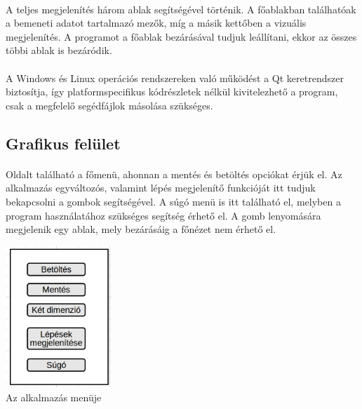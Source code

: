 \documentclass[12pt]{report}
\begin{document}
\paragraph{}
A teljes megjelenítés három ablak segítségével történik. A főablakban találhatóak a bemeneti adatot tartalmazó mezők, míg a másik kettőben a vizuális megjelenítés. A programot a főablak bezárásával tudjuk leállítani, ekkor az összes többi ablak is bezáródik.
\paragraph{}
A Windows és Linux operációs rendszereken való működést a Qt keretrendszer biztosítja, így platformspecifikus kódrészletek nélkül kivitelezhető a program, csak a megfelelő segédfájlok másolása szükséges.

\subsection{Grafikus felület}
\paragraph{}
Oldalt található a főmenü, ahonnan a mentés és betöltés opciókat érjük el. Az alkalmazás egyváltozós, valamint lépés megjelenítő funkcióját itt tudjuk bekapcsolni a gombok segítségével. A súgó menü is itt található el, melyben a program használatához szükséges segítség érhető el. A gomb lenyomására megjelenik egy ablak, mely bezárásáig a főnézet nem érhető el.
\begin{center}
\includegraphics[width=4cm]{pics/graphics/menu} \\
{\footnotesize Az alkalmazás menüje}
\end{center}
\end{document}
